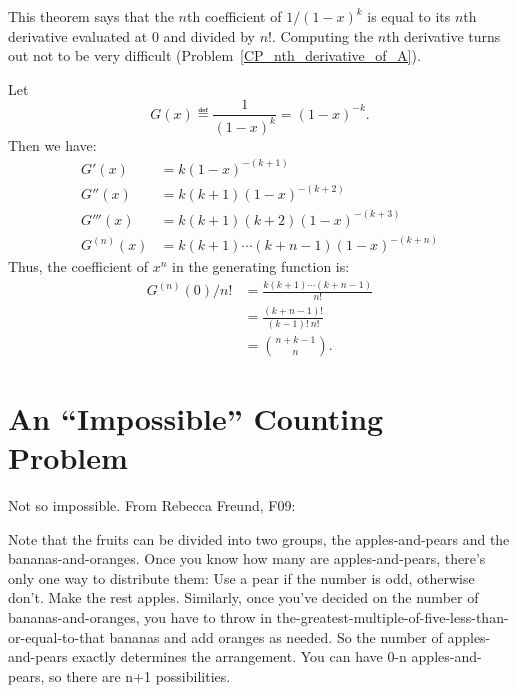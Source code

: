 This theorem says that the $n$th coefficient of $1 / (1 - x)^k$ is
equal to its $n$th derivative evaluated at 0 and divided by $n!$.
Computing the $n$th derivative turns out not to be very difficult
(Problem~\ref{CP_nth_derivative_of_A}).
\begin{editingnotes}

Let
%
\[
G(x) \eqdef \frac{1}{(1-x)^k} = (1-x)^{-k}.
\]
%
Then we have:
%
\begin{align*}
G'(x) & = k (1-x)^{-(k+1)} \\
G''(x) & = k (k+1) (1-x)^{-(k+2)} \\
G'''(x) & = k (k+1) (k+2) (1-x)^{-(k+3)} \\
G^{(n)}(x) & = k (k+1) \cdots (k + n - 1)(1-x)^{-(k+n)}
\end{align*}
%
Thus, the coefficient of $x^n$ in the generating function is:
%
\begin{align*}
G^{(n)}(0) / n! & = \frac{k (k+1) \cdots (k + n - 1)}{n!} \\
                & = \frac{(k + n - 1)!}{(k - 1)! \ n!} \\
                & = \binom{n + k - 1}{n}.
\end{align*}

\end{editingnotes}

\begin{problems}
\practiceproblems
{}

\classproblems
{}

\homeworkproblems
{}

\examproblems
{}

\end{problems}

\section{An ``Impossible'' Counting Problem}
\label{sec:impossible_counting}


\begin{editingnotes}

Not so impossible.  From Rebecca Freund, F09:

Note that the fruits can be divided into two groups, the apples-and-pears
and the bananas-and-oranges. Once you know how many are apples-and-pears,
there's only one way to distribute them: Use a pear if the number is odd,
otherwise don't. Make the rest apples. Similarly, once you've decided on
the number of bananas-and-oranges, you have to throw in
the-greatest-multiple-of-five-less-than-or-equal-to-that bananas and add
oranges as needed. So the number of apples-and-pears exactly determines
the arrangement. You can have 0-n apples-and-pears, so there are n+1
possibilities.

\end{editingnotes}

